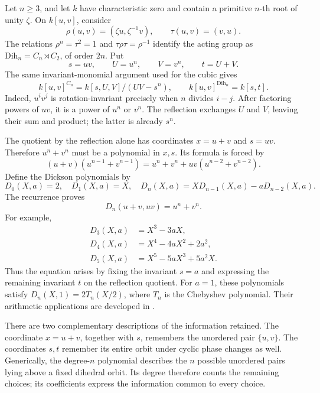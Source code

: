 \documentclass[11pt]{article}
\theoremstyle{remark}
\begin{document}
Let \(n\geq3\), and let \(k\) have characteristic zero and contain a primitive \(n\)-th root of unity \(\zeta\). On \(k[u,v]\), consider
\[
\rho(u,v)=(\zeta u,\zeta^{-1}v),
\qquad
\tau(u,v)=(v,u).
\]
The relations \(\rho^n=\tau^2=1\) and \(\tau\rho\tau=\rho^{-1}\) identify the acting group as \(\mathrm{Dih}_n=C_n\rtimes C_2\), of order \(2n\). Put
\[
s=uv,\qquad U=u^n,\qquad V=v^n,\qquad t=U+V.
\]
The same invariant-monomial argument used for the cubic gives
\begin{equation}
k[u,v]^{C_n}=k[s,U,V]/(UV-s^n),
\qquad
k[u,v]^{\mathrm{Dih}_n}=k[s,t].
\label{dihedral:invariants}
\end{equation}
Indeed, \(u^iv^j\) is rotation-invariant precisely when \(n\) divides \(i-j\). After factoring powers of \(uv\), it is a power of \(u^n\) or \(v^n\). The reflection exchanges \(U\) and \(V\), leaving their sum and product; the latter is already \(s^n\).

The quotient by the reflection alone has coordinates \(x=u+v\) and \(s=uv\). Therefore \(u^n+v^n\) must be a polynomial in \(x,s\). Its formula is forced by
\[
(u+v)(u^{n-1}+v^{n-1})
=u^n+v^n+uv(u^{n-2}+v^{n-2}).
\]
Define the Dickson polynomials by
\begin{equation}
D_0(X,a)=2,\quad D_1(X,a)=X,\quad
D_n(X,a)=X D_{n-1}(X,a)-aD_{n-2}(X,a).
\label{dihedral:recurrence}
\end{equation}
The recurrence proves
\begin{equation}
D_n(u+v,uv)=u^n+v^n.
\label{dihedral:identity}
\end{equation}
For example,
\begin{align*}
D_3(X,a)&=X^3-3aX,\\
D_4(X,a)&=X^4-4aX^2+2a^2,\\
D_5(X,a)&=X^5-5aX^3+5a^2X.
\end{align*}
Thus the equation arises by fixing the invariant \(s=a\) and expressing the remaining invariant \(t\) on the reflection quotient. For \(a=1\), these polynomials satisfy \(D_n(X,1)=2T_n(X/2)\), where \(T_n\) is the Chebyshev polynomial. Their arithmetic applications are developed in \cite{bluher}.

There are two complementary descriptions of the information retained. The coordinate \(x=u+v\), together with \(s\), remembers the unordered pair \(\{u,v\}\). The coordinates \(s,t\) remember its entire orbit under cyclic phase changes as well. Generically, the degree-\(n\) polynomial describes the \(n\) possible unordered pairs lying above a fixed dihedral orbit. Its degree therefore counts the remaining choices; its coefficients express the information common to every choice.
\end{document}
